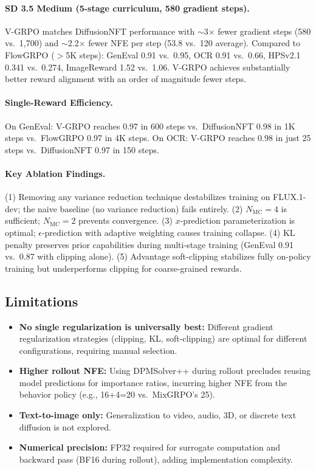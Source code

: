 \documentclass[11pt]{article}
\begin{document}
\paragraph{SD 3.5 Medium (5-stage curriculum, 580 gradient steps).}
V-GRPO matches DiffusionNFT performance with $\sim$3$\times$ fewer gradient steps (580 vs.\ 1,700) and $\sim$2.2$\times$ fewer NFE per step (53.8 vs.\ 120 average). Compared to FlowGRPO ($>$5K steps): GenEval 0.91 vs.\ 0.95, OCR 0.91 vs.\ 0.66, HPSv2.1 0.341 vs.\ 0.274, ImageReward 1.52 vs.\ 1.06. V-GRPO achieves substantially better reward alignment with an order of magnitude fewer steps.

\paragraph{Single-Reward Efficiency.}
On GenEval: V-GRPO reaches 0.97 in 600 steps vs.\ DiffusionNFT 0.98 in 1K steps vs.\ FlowGRPO 0.97 in 4K steps. On OCR: V-GRPO reaches 0.98 in just 25 steps vs.\ DiffusionNFT 0.97 in 150 steps.

\paragraph{Key Ablation Findings.}
(1) Removing any variance reduction technique destabilizes training on FLUX.1-dev; the naive baseline (no variance reduction) fails entirely. (2) $N_{\mathrm{MC}} = 4$ is sufficient; $N_{\mathrm{MC}} = 2$ prevents convergence. (3) $x$-prediction parameterization is optimal; $\epsilon$-prediction with adaptive weighting causes training collapse. (4) KL penalty preserves prior capabilities during multi-stage training (GenEval 0.91 vs.\ 0.87 with clipping alone). (5) Advantage soft-clipping stabilizes fully on-policy training but underperforms clipping for coarse-grained rewards.

\subsection{Limitations}

\begin{itemize}
    \item \textbf{No single regularization is universally best:} Different gradient regularization strategies (clipping, KL, soft-clipping) are optimal for different configurations, requiring manual selection.
    \item \textbf{Higher rollout NFE:} Using DPMSolver++ during rollout precludes reusing model predictions for importance ratios, incurring higher NFE from the behavior policy (e.g., 16+4=20 vs.\ MixGRPO's 25).
    \item \textbf{Text-to-image only:} Generalization to video, audio, 3D, or discrete text diffusion is not explored.
    \item \textbf{Numerical precision:} FP32 required for surrogate computation and backward pass (BF16 during rollout), adding implementation complexity.
\end{itemize}
\end{document}
